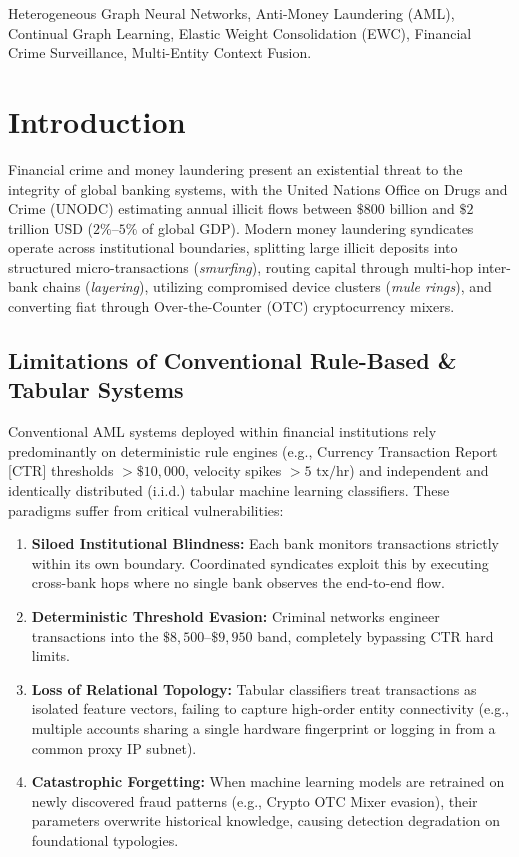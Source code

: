 \documentclass[conference]{IEEEtran}
\begin{document}
\begin{IEEEkeywords}
Heterogeneous Graph Neural Networks, Anti-Money Laundering (AML), Continual Graph Learning, Elastic Weight Consolidation (EWC), Financial Crime Surveillance, Multi-Entity Context Fusion.
\end{IEEEkeywords}

\section{Introduction}
Financial crime and money laundering present an existential threat to the integrity of global banking systems, with the United Nations Office on Drugs and Crime (UNODC) estimating annual illicit flows between $\$800$ billion and $\$2$ trillion USD ($2\%\text{--}5\%$ of global GDP). Modern money laundering syndicates operate across institutional boundaries, splitting large illicit deposits into structured micro-transactions (\textit{smurfing}), routing capital through multi-hop inter-bank chains (\textit{layering}), utilizing compromised device clusters (\textit{mule rings}), and converting fiat through Over-the-Counter (OTC) cryptocurrency mixers.

\subsection{Limitations of Conventional Rule-Based \& Tabular Systems}
Conventional AML systems deployed within financial institutions rely predominantly on deterministic rule engines (e.g., Currency Transaction Report [CTR] thresholds $> \$10,000$, velocity spikes $> 5\text{ tx/hr}$) and independent and identically distributed (i.i.d.) tabular machine learning classifiers. These paradigms suffer from critical vulnerabilities:
\begin{enumerate}
    \item \textbf{Siloed Institutional Blindness:} Each bank monitors transactions strictly within its own boundary. Coordinated syndicates exploit this by executing cross-bank hops where no single bank observes the end-to-end flow.
    \item \textbf{Deterministic Threshold Evasion:} Criminal networks engineer transactions into the $\$8,500\text{--}\$9,950$ band, completely bypassing CTR hard limits.
    \item \textbf{Loss of Relational Topology:} Tabular classifiers treat transactions as isolated feature vectors, failing to capture high-order entity connectivity (e.g., multiple accounts sharing a single hardware fingerprint or logging in from a common proxy IP subnet).
    \item \textbf{Catastrophic Forgetting:} When machine learning models are retrained on newly discovered fraud patterns (e.g., Crypto OTC Mixer evasion), their parameters overwrite historical knowledge, causing detection degradation on foundational typologies.
\end{enumerate}
\end{document}
